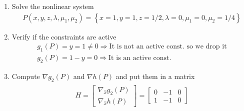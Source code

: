 \documentclass[a4paper,12pt]{article}
\begin{document}
{{\begin{enumerate}
				\item Solve the nonlinear system
				\begin{gather*}
				P(x,y,z,\lambda, \mu_1, \mu_2)= \left\{ x=1, y=1, z=1/2, \lambda = 0, \mu_1 = 0, \mu_2 = 1/4 \right\} 
			\end{gather*}
				\item Verify if the constraints are active
				\begin{gather*}
				g_1(P)=y=1 \ne 0 \Rightarrow \text{It is not an active const. so we drop it}\\
				g_2(P)=1-y=0 \Rightarrow \text{It is an active const.}
			\end{gather*}
				\item Compute  $\nabla g_2(P)$ and $\nabla h(P)$  and put them in a matrix
						\begin{gather*}
				\begin{align*}
					H = \begin{bmatrix}
						\nabla_{\stackrel{-}{x}} g_2(P)\\
						\nabla_{\stackrel{-}{x}} h(P)
					\end{bmatrix} =
					\begin{bmatrix}
						0 & -1 & 0\\
						1 & -1 & 0
					\end{bmatrix}
				\end{align*}
			\end{gather*}
	\end{enumerate}
	}}
\end{document}
